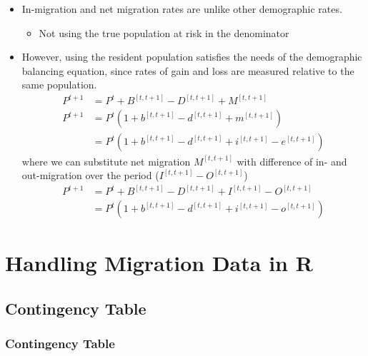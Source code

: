 \documentclass[
]{book}
\providecommand{\tightlist}{%
  \setlength{\itemsep}{0pt}\setlength{\parskip}{0pt}}
\begin{document}
\begin{itemize}
\tightlist
\item
  In-migration and net migration rates are unlike other demographic rates.

  \begin{itemize}
  \tightlist
  \item
    Not using the true population at risk in the denominator
  \end{itemize}
\item
  However, using the resident population satisfies the needs of the demographic balancing equation, since rates of gain and loss are measured relative to the same population.
  \[
  \begin{aligned}
  P^{t+1} &=  P^{t} + B^{[t, t +1]} - D^{[t, t +1]} +  M^{[t, t +1]} \\
  P^{t+1} &=  P^{t} \left(1 + b^{[t, t +1]} - d^{[t, t +1]} +  m^{[t, t +1]} \right)\\
  &= P^{t} \left(1 + b^{[t, t +1]} - d^{[t, t +1]} +  i^{[t, t +1]} - e^{[t, t +1]} \right)
  \end{aligned}
  \]
  where we can substitute net migration \(M^{[t, t +1]}\) with difference of in- and out-migration over the period (\(I^{[t, t +1]} - O^{[t, t +1]}\))
  \[
  \begin{aligned}
  P^{t+1}&= P^{t} + B^{[t, t +1]} - D^{[t, t +1]} +  I^{[t, t +1]} - O^{[t, t +1]} \\
  &= P^{t} \left(1 + b^{[t, t +1]} - d^{[t, t +1]} +  i^{[t, t +1]} - o^{[t, t +1]} \right)
  \end{aligned}
  \]
\end{itemize}

\hypertarget{handling-migration-data-in-r}{%
\chapter{Handling Migration Data in R}\label{handling-migration-data-in-r}}

\hypertarget{contingency-table}{%
\section{Contingency Table}\label{contingency-table}}

\hypertarget{contingency-table-1}{%
\subsection{Contingency Table}\label{contingency-table-1}}
\end{document}

